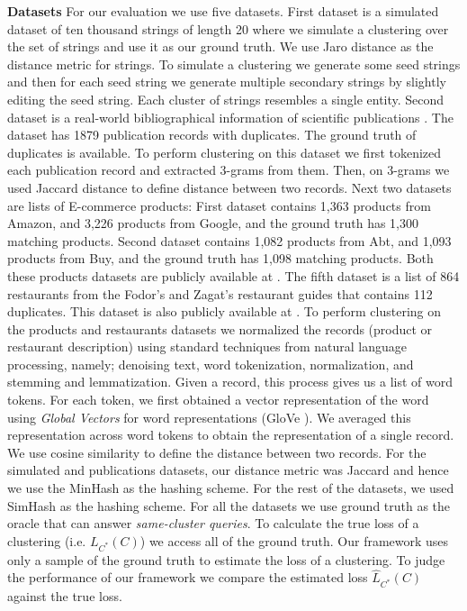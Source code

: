 \documentclass[12pt]{article}
\begin{document}
\textbf{Datasets} For our evaluation we use five datasets.
First dataset is a simulated dataset of ten thousand strings of length 20 where we simulate a clustering over the set of strings and use it as our ground truth.
We use Jaro distance \cite{jaro1980unimatch} as the distance metric for strings.
To simulate a clustering we generate some seed strings and then for each seed string we generate multiple secondary strings by slightly editing the seed string.
Each cluster of strings resembles a single entity.
Second dataset is a real-world bibliographical information of scientific publications \cite{pubdata}.
The dataset has 1879 publication records with duplicates.
The ground truth of duplicates is available.
To perform clustering on this dataset we first tokenized each publication record and extracted 3-grams from them.
Then, on 3-grams we used Jaccard distance to define distance between two records.
Next two datasets are lists of E-commerce products: First dataset contains 1,363 products from Amazon, and 3,226 products from Google, and the ground truth has 1,300 matching products.
Second dataset contains 1,082 products from Abt, and 1,093 products from Buy, and the ground truth has 1,098 matching products. Both these products datasets are publicly available at \cite{products}. 
The fifth dataset is a list of 864 restaurants from the Fodor's and Zagat's restaurant guides that contains 112 duplicates. This dataset is also publicly available at \cite{restaurant}.
To perform clustering on the products and restaurants datasets we normalized the records (product or restaurant description) using standard techniques from natural language processing, namely; denoising text, word tokenization, normalization, and stemming and lemmatization. Given a record, this process gives us a list of word tokens. For each token, we first obtained a vector representation of the word using  \textit{Global Vectors} for word representations (GloVe \cite{jeffrey2014glove}). We averaged this representation across word tokens to obtain the representation of a single record. We use cosine similarity to define the distance between two records.
For the simulated and publications datasets, our distance metric was Jaccard and hence we use the MinHash \cite{broder2000min} as the hashing scheme. For the rest of the datasets, we used SimHash \cite{charikar2002similarity} as the hashing scheme. 
For all the datasets we use ground truth as the oracle that can answer \textit{same-cluster queries}. 
To calculate the true loss of a clustering (i.e. $L_{C^*}(C)$) we access all of the ground truth. Our framework uses only a sample of the ground truth to estimate the loss of a clustering.
To judge the performance of our framework we compare the estimated loss $\hat L_{C^*}(C)$ against the true loss.
\end{document}
